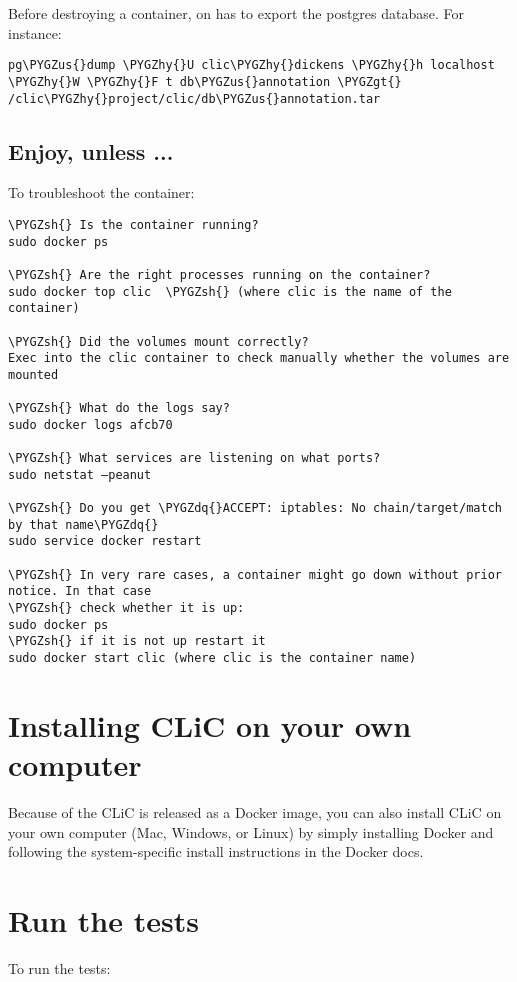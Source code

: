 \documentclass[letterpaper,10pt,english]{sphinxmanual}
\def\PYGZus{\char`\_}
\def\PYGZgt{\char`\>}
\def\PYGZsh{\char`\#}
\def\PYGZhy{\char`\-}
\def\PYGZdq{\char`\"}
\begin{document}
Before destroying a container, on has to export the postgres database. For instance:

\begin{Verbatim}[commandchars=\\\{\}]
pg\PYGZus{}dump \PYGZhy{}U clic\PYGZhy{}dickens \PYGZhy{}h localhost \PYGZhy{}W \PYGZhy{}F t db\PYGZus{}annotation \PYGZgt{} /clic\PYGZhy{}project/clic/db\PYGZus{}annotation.tar
\end{Verbatim}


\subsection{Enjoy, unless ...}
\label{admin:enjoy-unless}
To troubleshoot the container:

\begin{Verbatim}[commandchars=\\\{\}]
\PYGZsh{} Is the container running?
sudo docker ps

\PYGZsh{} Are the right processes running on the container?
sudo docker top clic  \PYGZsh{} (where clic is the name of the container)

\PYGZsh{} Did the volumes mount correctly?
Exec into the clic container to check manually whether the volumes are mounted

\PYGZsh{} What do the logs say?
sudo docker logs afcb70

\PYGZsh{} What services are listening on what ports?
sudo netstat –peanut

\PYGZsh{} Do you get \PYGZdq{}ACCEPT: iptables: No chain/target/match by that name\PYGZdq{}
sudo service docker restart

\PYGZsh{} In very rare cases, a container might go down without prior notice. In that case
\PYGZsh{} check whether it is up:
sudo docker ps
\PYGZsh{} if it is not up restart it
sudo docker start clic (where clic is the container name)
\end{Verbatim}


\section{Installing CLiC on your own computer}
\label{admin:installing-clic-on-your-own-computer}
Because of the CLiC is released as a Docker image, you can also install CLiC on
your own computer (Mac, Windows, or Linux) by simply installing Docker and
following the system-specific install instructions in the Docker docs.


\section{Run the tests}
\label{admin:run-the-tests}
To run the tests:
\end{document}
